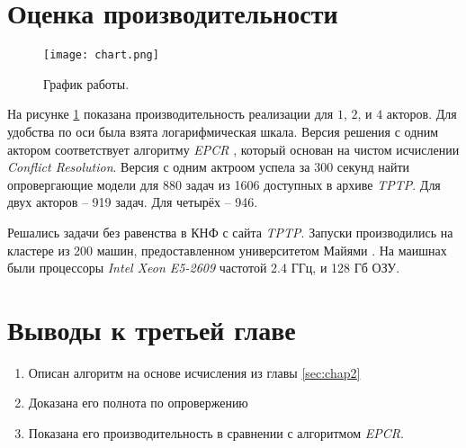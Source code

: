 \section{Оценка производительности}
\begin{figure}[!h]
\centering
\texttt{[image: chart.png]}
\caption{График работы.}\label{fig:chart}
\end{figure}

На рисунке \ref{fig:chart} показана производительность реализации для $1$, $2$, и $4$ акторов. Для удобства по оси  была взята логарифмическая шкала. Версия решения с одним актором соответствует алгоритму \emph{EPCR} \cite{DBLP:journals/corr/ItegulovSP17}, который основан на чистом исчислении \emph{Conflict Resolution}. Версия с одним актроом успела за 300 секунд найти опровергающие модели для 880 задач из 1606 доступных в архиве \emph{TPTP}. Для двух акторов -- 919 задач. Для четырёх -- 946.

Решались задачи без равенства в КНФ с сайта \emph{TPTP}. Запуски производились на кластере из 200 машин, предоставленном университетом Майями \cite{StarExec}. На маишнах были процессоры \emph{Intel Xeon E5-2609} частотой 2.4 ГГц, и 128 Гб ОЗУ.

\section{Выводы к третьей главе}
\begin{enumerate}
	\item Описан алгоритм на основе исчисления из главы \ref{sec:chap2}
    \item Доказана его полнота по опровержению
    \item Показана его производительность в сравнении с алгоритмом \emph{EPCR}.
\end{enumerate}